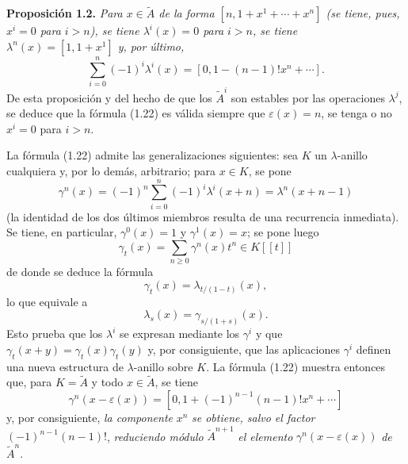 \textbf{Proposición 1.2.} \emph{Para $x\in\widetilde A$ de la forma $[n,1+x^1+\cdots+x^n]$ (se tiene, pues, $x^i=0$ para $i>n$), se tiene $\lambda^i(x)=0$ para $i>n$, se tiene $\lambda^n(x)=[1,1+x^1]$ y, por último,}
\begin{equation}\tag{1.22}
\sum_{i=0}^n(-1)^i\lambda^i(x)=[0,1-(n-1)!x^n+\cdots].
\end{equation}
De esta proposición y del hecho de que los $\widetilde A^i$ son estables por las operaciones $\lambda^j$, se deduce que la fórmula (1.22) es válida siempre que $\varepsilon(x)=n$, se tenga o no $x^i=0$ para $i>n$.

La fórmula (1.22) admite las generalizaciones siguientes: sea $K$ un $\lambda$-anillo cualquiera y, por lo demás, arbitrario; para $x\in K$, se pone
\begin{equation}\tag{1.23}
\gamma^n(x)=(-1)^n\sum_{i=0}^n(-1)^i\lambda^i(x+n)=\lambda^n(x+n-1)
\end{equation}
(la identidad de los dos últimos miembros resulta de una recurrencia inmediata). Se tiene, en particular, $\gamma^0(x)=1$ y $\gamma^1(x)=x$; se pone luego
\begin{equation}\tag{1.24}
\gamma_t(x)=\sum_{n\geq0}\gamma^n(x)t^n\in K[[t]]
\end{equation}
de donde se deduce la fórmula
\begin{equation}\tag{1.25}
\gamma_t(x)=\lambda_{t/(1-t)}(x),
\end{equation}
lo que equivale a
\begin{equation}\tag{1.25 bis}
\lambda_s(x)=\gamma_{s/(1+s)}(x).
\end{equation}
Esto prueba que los $\lambda^i$ se expresan mediante los $\gamma^i$ y que $\gamma_t(x+y)=\gamma_t(x)\gamma_t(y)$ y, por consiguiente, que las aplicaciones $\gamma^i$ definen una nueva estructura de $\lambda$-anillo sobre $K$. La fórmula (1.22) muestra entonces que, para $K=\widetilde A$ y todo $x\in\widetilde A$, se tiene
\begin{equation}\tag{1.22 bis}
\gamma^n(x-\varepsilon(x))=[0,1+(-1)^{n-1}(n-1)!x^n+\cdots]
\end{equation}
y, por consiguiente, \emph{la componente} $x^n$ \emph{se obtiene, salvo el factor} $(-1)^{n-1}(n-1)!$, \emph{reduciendo módulo} $\widetilde A^{n+1}$ \emph{el elemento} $\gamma^n(x-\varepsilon(x))$ \emph{de} $\widetilde A^n$.


